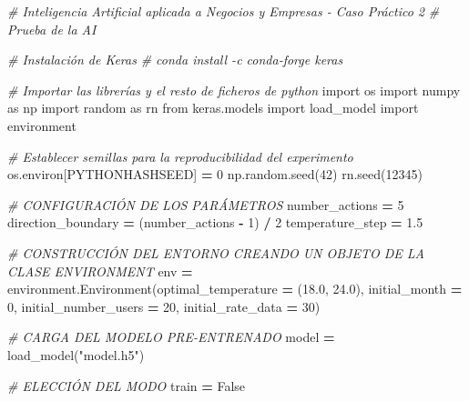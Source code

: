 \documentclass[
]{book}
\newenvironment{Shaded}{\begin{snugshade}}{\end{snugshade}}
\newcommand{\CommentTok}[1]{\textcolor[rgb]{0.56,0.35,0.01}{\textit{#1}}}
\newcommand{\DecValTok}[1]{\textcolor[rgb]{0.00,0.00,0.81}{#1}}
\newcommand{\FloatTok}[1]{\textcolor[rgb]{0.00,0.00,0.81}{#1}}
\newcommand{\ImportTok}[1]{#1}
\newcommand{\NormalTok}[1]{#1}
\newcommand{\OperatorTok}[1]{\textcolor[rgb]{0.81,0.36,0.00}{\textbf{#1}}}
\newcommand{\StringTok}[1]{\textcolor[rgb]{0.31,0.60,0.02}{#1}}
\newcommand{\VariableTok}[1]{\textcolor[rgb]{0.00,0.00,0.00}{#1}}
\begin{document}
\begin{Shaded}
\begin{Highlighting}[]
\CommentTok{\# Inteligencia Artificial aplicada a Negocios y Empresas {-} Caso Práctico 2}
\CommentTok{\# Prueba de la AI}

\CommentTok{\# Instalación de Keras}
\CommentTok{\# conda install {-}c conda{-}forge keras}

\CommentTok{\# Importar las librerías y el resto de ficheros de python}
\ImportTok{import}\NormalTok{ os}
\ImportTok{import}\NormalTok{ numpy }\ImportTok{as}\NormalTok{ np}
\ImportTok{import}\NormalTok{ random }\ImportTok{as}\NormalTok{ rn}
\ImportTok{from}\NormalTok{ keras.models }\ImportTok{import}\NormalTok{ load\_model}
\ImportTok{import}\NormalTok{ environment}

\CommentTok{\# Establecer semillas para la reproducibilidad del experimento}
\NormalTok{os.environ[}\StringTok{\textquotesingle{}PYTHONHASHSEED\textquotesingle{}}\NormalTok{] }\OperatorTok{=} \StringTok{\textquotesingle{}0\textquotesingle{}}
\NormalTok{np.random.seed(}\DecValTok{42}\NormalTok{)}
\NormalTok{rn.seed(}\DecValTok{12345}\NormalTok{)}

\CommentTok{\# CONFIGURACIÓN DE LOS PARÁMETROS}
\NormalTok{number\_actions }\OperatorTok{=} \DecValTok{5}
\NormalTok{direction\_boundary }\OperatorTok{=}\NormalTok{ (number\_actions }\OperatorTok{{-}} \DecValTok{1}\NormalTok{) }\OperatorTok{/} \DecValTok{2}
\NormalTok{temperature\_step }\OperatorTok{=} \FloatTok{1.5}

\CommentTok{\# CONSTRUCCIÓN DEL ENTORNO CREANDO UN OBJETO DE LA CLASE ENVIRONMENT}
\NormalTok{env }\OperatorTok{=}\NormalTok{ environment.Environment(optimal\_temperature }\OperatorTok{=}\NormalTok{ (}\FloatTok{18.0}\NormalTok{, }\FloatTok{24.0}\NormalTok{),}
\NormalTok{                              initial\_month }\OperatorTok{=} \DecValTok{0}\NormalTok{,}
\NormalTok{                              initial\_number\_users }\OperatorTok{=} \DecValTok{20}\NormalTok{,}
\NormalTok{                              initial\_rate\_data }\OperatorTok{=} \DecValTok{30}\NormalTok{)}

\CommentTok{\# CARGA DEL MODELO PRE{-}ENTRENADO}
\NormalTok{model }\OperatorTok{=}\NormalTok{ load\_model(}\StringTok{"model.h5"}\NormalTok{)}

\CommentTok{\# ELECCIÓN DEL MODO}
\NormalTok{train }\OperatorTok{=} \VariableTok{False}


\end{Highlighting}
\end{Shaded}
\end{document}
